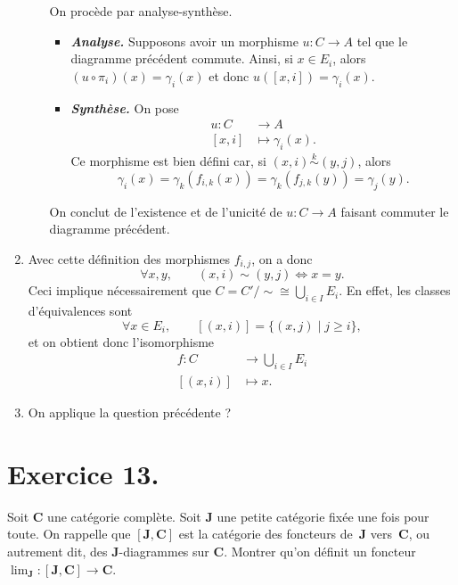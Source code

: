 \documentclass{../../td}
\begin{document}
\begin{enumerate}
\begin{enumerate}
          On procède par analyse-synthèse.
          \begin{itemize}
            \item \textbf{\textsl{\color{deepblue}Analyse.}}
              Supposons avoir un morphisme $u : C \to A$ tel que le diagramme précédent commute.
              Ainsi, si $x \in E_i$, alors $(u \circ \pi_i)(x) = \gamma_i(x)$ et donc $u([x,i]) = \gamma_i(x)$.
            \item \textbf{\textsl{\color{deepblue}Synthèse.}}
              On pose \begin{align*}
                u: C &\longrightarrow A \\
                [x,i] &\longmapsto \gamma_i(x)
              .\end{align*}
              Ce morphisme est bien défini car, si $(x,i) \overset k \sim (y,j)$, alors \[
              \gamma_i(x) = \gamma_k(f_{i,k}(x)) = \gamma_k(f_{j,k}(y)) = \gamma_j(y)
              .\]
          \end{itemize}
          On conclut de l'existence et de l'unicité de $u : C \to A$ faisant commuter le diagramme précédent.
      \end{enumerate}
    \item Avec cette définition des morphismes $f_{i,j}$, on a donc \[
      \forall x,y, \quad\quad (x,i) \sim (y,j) \iff x = y
      .\]
      Ceci implique nécessairement que $C = C' / {\sim} \cong \bigcup_{i \in I} E_i$. En effet, les classes d'équivalences sont \[
        \forall x \in E_i, \quad\quad [(x,i)] = \{(x,j)  \mid j \ge i\} 
      ,\]et on obtient donc l'isomorphisme \begin{align*}
        f: C &\longrightarrow \bigcup_{i \in  I} E_i \\
        [(x,i)] &\longmapsto x
      .\end{align*}
    \item On applique la question précédente ?
  \end{enumerate}

  \chapter{Exercice 13.}

  \begin{slshape}
    \color{deepblue}
    Soit $\mathbf{C}$ une catégorie complète. Soit $\mathbf{J}$ une petite catégorie fixée une fois pour toute. On rappelle que $[\mathbf{J},\mathbf{C}]$ est la catégorie des foncteurs de~$\mathbf{J}$ vers~$\mathbf{C}$, ou autrement dit, des $\mathbf{J}$-diagrammes sur $\mathbf{C}$. Montrer qu'on définit un foncteur $\lim_\mathbf{J} : [\mathbf{J},\mathbf{C}] \to \mathbf{C}$.
  \end{slshape}
\end{document}
